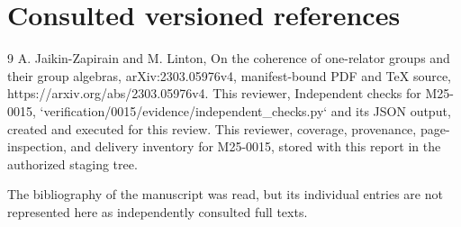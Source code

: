\documentclass[10pt]{article}
\begin{document}
\section*{Consulted versioned references}
9 A. Jaikin-Zapirain and M. Linton, On the coherence of one-relator groups and their group algebras, arXiv:2303.05976v4, manifest-bound PDF and TeX source, https://arxiv.org/abs/2303.05976v4. This reviewer, Independent checks for M25-0015, `verification/0015/evidence/independent\_checks.py` and its JSON output, created and executed for this review. This reviewer, coverage, provenance, page-inspection, and delivery inventory for M25-0015, stored with this report in the authorized staging tree.\par
The bibliography of the manuscript was read, but its individual entries are not represented here as independently consulted full texts.\par
\end{document}
